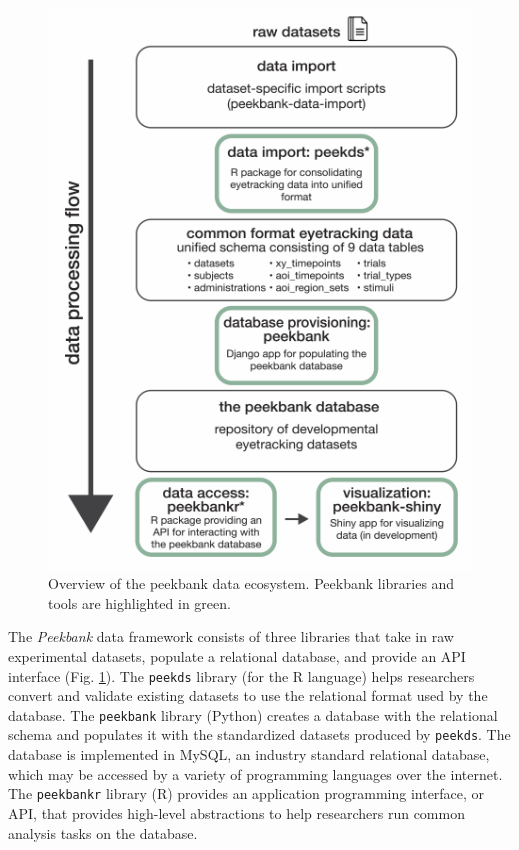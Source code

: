 \documentclass[10pt, letterpaper]{article}
\newenvironment{CodeChunk}{}{}
\begin{document}
\begin{CodeChunk}
\begin{figure}[tb]

{\centering \includegraphics{figs/fig_framework_overview-1} 

}

\caption[Overview of the peekbank data ecosystem]{Overview of the peekbank data ecosystem. Peekbank libraries and tools are highlighted in green.}\label{fig:fig_framework_overview}
\end{figure}
\end{CodeChunk}

The \emph{Peekbank} data framework consists of three libraries that take
in raw experimental datasets, populate a relational database, and
provide an API interface (Fig. \ref{fig:fig_framework_overview}). The
\texttt{peekds} library (for the R language) helps researchers convert
and validate existing datasets to use the relational format used by the
database. The \texttt{peekbank} library (Python) creates a database with
the relational schema and populates it with the standardized datasets
produced by \texttt{peekds}. The database is implemented in MySQL, an
industry standard relational database, which may be accessed by a
variety of programming languages over the internet. The
\texttt{peekbankr} library (R) provides an application programming
interface, or API, that provides high-level abstractions to help
researchers run common analysis tasks on the database.
\end{document}
